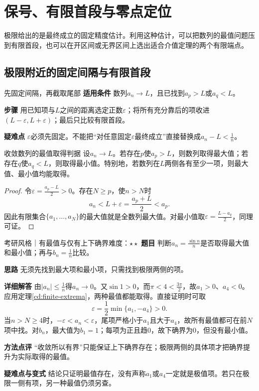 \section{保号、有限首段与零点定位}\label{cd:limits-sign}
\begin{examtip}
极限给出的是最终成立的固定精度估计。利用这种估计，可以把数列的最值问题压到有限首段，也可以在开区间或无界区间上选出适合介值定理的两个有限端点。
\end{examtip}

\subsection{极限附近的固定间隔与有限首段}
\begin{method}{先固定间隔，再截取尾部}
\textbf{适用条件} 数列$a_n\to L$，且已找到$a_p>L$或$a_q<L$。\par
\textbf{步骤} 用已知项与$L$之间的距离选定正数$\varepsilon$；将所有充分靠后的项收进$(L-\varepsilon,L+\varepsilon)$；最后只比较有限首段。\par
\textbf{疑难点} $\varepsilon$必须先固定。不能把“对任意固定$\varepsilon$最终成立”直接替换成$a_n-L<\frac{1}{n}$。
\end{method}
\begin{theorem}{收敛数列的最值取得判据}\label{cd:finite-extrema}
设$a_n\to L$。若存在$p$使$a_p>L$，则数列取得最大值；若存在$q$使$a_q<L$，则取得最小值。特别地，若数列在$L$两侧各有至少一项，则最大值、最小值均能取得。
\end{theorem}
\begin{proof}
令$\varepsilon=\frac{a_p-L}{2}>0$。存在$N\ge p$，使$n>N$时
\[
 a_n<L+\varepsilon=\dfrac{a_p+L}{2}<a_p.
\]
因此有限集合$\{a_1,\ldots,a_N\}$的最大值就是全数列最大值。对最小值取$\varepsilon=\frac{L-a_q}{2}$，同理可证。
\end{proof}
\begin{example}{考研风格｜有最值与仅有上下确界}{难度：$\star\star$}\label{cd:ex:finite-extrema}
\textbf{题目} 判断$a_n=\frac{\sin n}{n}$是否取得最大值和最小值；再与$b_n=\frac{1}{n}$比较。\par
\textbf{思路} 无须先找到最大项和最小项，只需找到极限两侧的项。\par
\textbf{详细解答} 由$|a_n|\le\frac{1}{n}$得$a_n\to0$。又$\sin1>0$，而$\pi<4<\frac{3\pi}{2}$，故$a_1>0$、$a_4<0$。应用定理\ref{cd:finite-extrema}，两种最值都能取得。直接证明时可取
\[
 \varepsilon=\dfrac12\min\{a_1,-a_4\}>0.
\]
当$n>N\ge4$时，$-\varepsilon<a_n<\varepsilon$，尾项严格小于$a_1$且大于$a_4$，故所有最值都可在前$N$项中找。对$b_n$，最大值为$b_1=1$；每项为正且趋0，故下确界为0，但没有最小值。\par
\textbf{方法点评} “收敛所以有界”只能保证上下确界存在；极限两侧的具体项才把确界提升为实际取得的最值。\par
\textbf{疑难点与变式} 结论只证明最值存在，没有声称$a_1$或$a_4$一定就是极值项。若只在极限一侧有项，另一种最值仍须另查。
\end{example}

